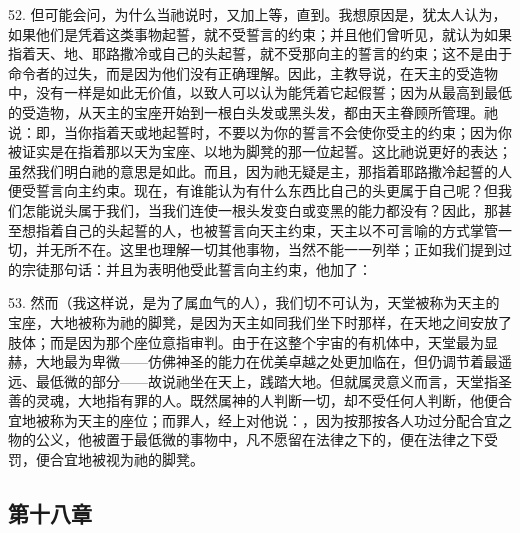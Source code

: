 52. 但可能会问，为什么当祂说时，又加上等，直到。我想原因是，犹太人认为，如果他们是凭着这类事物起誓，就不受誓言的约束；并且他们曾听见，就认为如果指着天、地、耶路撒冷或自己的头起誓，就不受那向主的誓言的约束；这不是由于命令者的过失，而是因为他们没有正确理解。因此，主教导说，在天主的受造物中，没有一样是如此无价值，以致人可以认为能凭着它起假誓；因为从最高到最低的受造物，从天主的宝座开始到一根白头发或黑头发，都由天主眷顾所管理。祂说：即，当你指着天或地起誓时，不要以为你的誓言不会使你受主的约束；因为你被证实是在指着那以天为宝座、以地为脚凳的那一位起誓。这比祂说更好的表达；虽然我们明白祂的意思是如此。而且，因为祂无疑是主，那指着耶路撒冷起誓的人便受誓言向主约束。现在，有谁能认为有什么东西比自己的头更属于自己呢？但我们怎能说头属于我们，当我们连使一根头发变白或变黑的能力都没有？因此，那甚至想指着自己的头起誓的人，也被誓言向天主约束，天主以不可言喻的方式掌管一切，并无所不在。这里也理解一切其他事物，当然不能一一列举；正如我们提到过的宗徒那句话：并且为表明他受此誓言向主约束，他加了：\par

53. 然而（我这样说，是为了属血气的人），我们切不可认为，天堂被称为天主的宝座，大地被称为祂的脚凳，是因为天主如同我们坐下时那样，在天地之间安放了肢体；而是因为那个座位意指审判。由于在这整个宇宙的有机体中，天堂最为显赫，大地最为卑微——仿佛神圣的能力在优美卓越之处更加临在，但仍调节着最遥远、最低微的部分——故说祂坐在天上，践踏大地。但就属灵意义而言，天堂指圣善的灵魂，大地指有罪的人。既然属神的人判断一切，却不受任何人判断，他便合宜地被称为天主的座位；而罪人，经上对他说：，因为按那按各人功过分配合宜之物的公义，他被置于最低微的事物中，凡不愿留在法律之下的，便在法律之下受罚，便合宜地被视为祂的脚凳。\par


\subsection{第十八章}

